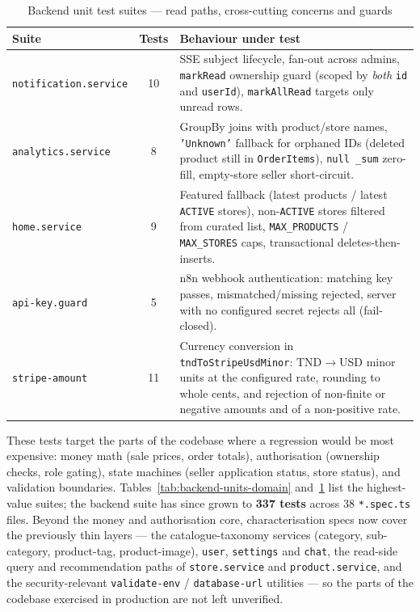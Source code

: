 \documentclass[12pt, a4paper, oneside]{report}
\begin{document}
\begin{table}[H]
\centering
\small
\setlength{\tabcolsep}{8pt}
\setlength{\extrarowheight}{3pt}
\renewcommand{\arraystretch}{1.4}
\begin{tabular}{|>{\raggedright\arraybackslash}p{3.8cm}|c|>{\raggedright\arraybackslash}p{6.8cm}|}
\hline
\rowcolor{cheebolightgray}
\textbf{Suite} & \textbf{Tests} & \textbf{Behaviour under test} \\
\hline
\texttt{notification.service} & 10 & SSE subject lifecycle, fan-out across admins, \texttt{markRead} ownership guard (scoped by \emph{both} \texttt{id} and \texttt{userId}), \texttt{markAllRead} targets only unread rows. \\
\hline
\texttt{analytics.service} & 8 & GroupBy joins with product/store names, \texttt{'Unknown'} fallback for orphaned IDs (deleted product still in \texttt{OrderItems}), \texttt{null \_sum} zero-fill, empty-store seller short-circuit. \\
\hline
\texttt{home.service} & 9 & Featured fallback (latest products / latest \texttt{ACTIVE} stores), non-\texttt{ACTIVE} stores filtered from curated list, \texttt{MAX\_PRODUCTS} / \texttt{MAX\_STORES} caps, transactional deletes-then-inserts. \\
\hline
\texttt{api-key.guard} & 5 & n8n webhook authentication: matching key passes, mismatched/missing rejected, server with no configured secret rejects all (fail-closed). \\
\hline
\texttt{stripe-amount} & 11 & Currency conversion in \texttt{tndToStripeUsdMinor}: TND$\to$USD minor units at the configured rate, rounding to whole cents, and rejection of non-finite or negative amounts and of a non-positive rate. \\
\hline
\end{tabular}
\caption{Backend unit test suites — read paths, cross-cutting concerns and guards}
\label{tab:backend-units-readside}
\end{table}

These tests target the parts of the codebase where a regression would
be most expensive: money math (sale prices, order totals),
authorisation (ownership checks, role gating), state machines (seller
application status, store status), and validation boundaries.
Tables~\ref{tab:backend-units-domain} and~\ref{tab:backend-units-readside}
list the highest-value suites; the backend suite has since grown to
\textbf{337 tests} across 38 \texttt{*.spec.ts} files. Beyond the
money and authorisation core, characterisation specs now cover the
previously thin layers --- the catalogue-taxonomy services (category,
sub-category, product-tag, product-image), \texttt{user},
\texttt{settings} and \texttt{chat}, the read-side query and
recommendation paths of \texttt{store.service} and
\texttt{product.service}, and the security-relevant
\texttt{validate-env} / \texttt{database-url} utilities --- so the
parts of the codebase exercised in production are not left unverified.
\end{document}
